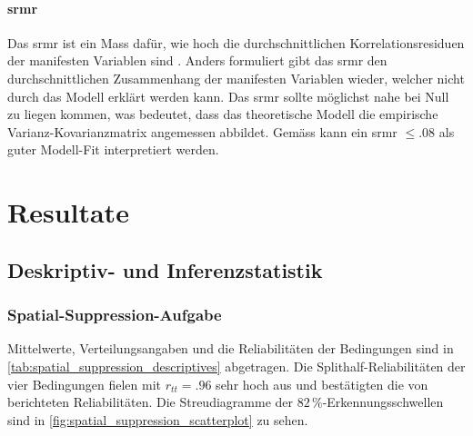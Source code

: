 \documentclass[11pt, twoside, a4paper]{book}		%
\begin{document}
\subsubsection*{\gls{srmr}}
Das \gls{srmr} ist ein Mass dafür, wie hoch die durchschnittlichen Korrelationsresiduen der manifesten Variablen sind \citep{Kline2011}. Anders formuliert gibt das \gls{srmr} den durchschnittlichen Zusammenhang der manifesten Variablen wieder, welcher nicht durch das Modell erklärt werden kann. Das \gls{srmr} sollte möglichst nahe bei Null zu liegen kommen, was bedeutet, dass das theoretische Modell die empirische Var\-ianz-Ko\-var\-ianz\-ma\-trix angemessen abbildet. Gemäss \citet{Hu1999} kann ein \gls{srmr} $\leq.08$ als guter Modell-Fit interpretiert werden.











\chapter{Resultate \label{cha:Resultate}}

\section{Deskriptiv- und Inferenzstatistik \label{sec:Deskriptive_Statistik}}

\subsection{Spatial-Suppression-Aufgabe \label{subsec:SSres}}

Mittelwerte, Verteilungsangaben und die Reliabilitäten der Bedingungen sind in \autoref{tab:spatial_suppression_descriptives} abgetragen. 
Die Splithalf-Reliabilitäten der vier Bedingungen fielen mit $r_{tt}=.96$ sehr hoch aus und bestätigten die von \citet{Melnick2013} berichteten Reliabilitäten.
Die Streudiagramme der $82\,\%$-Er\-ken\-nungs\-schwel\-len sind in \autoref{fig:spatial_suppression_scatterplot} zu sehen.
\end{document}
